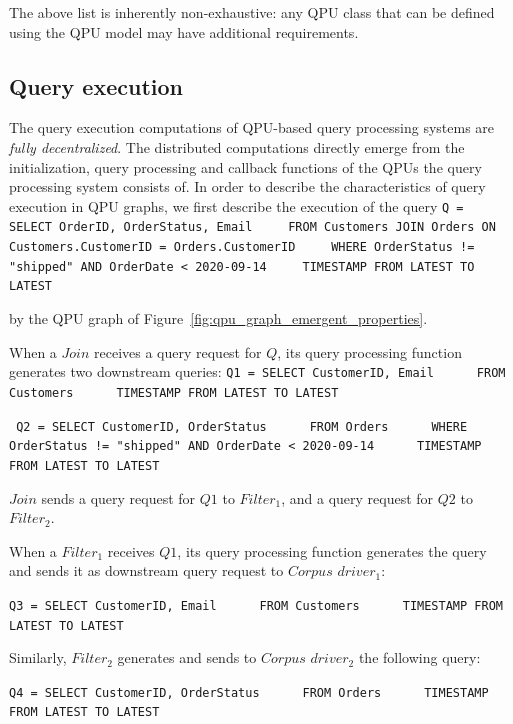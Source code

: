 The above list is inherently non-exhaustive:
any QPU class that can be defined using the QPU model may have additional requirements.

\subsection{Query execution}
\label{sec:computation_model}

The query execution computations of QPU-based query processing systems are \textit{fully decentralized}.
The distributed computations directly emerge from the initialization, query processing and callback functions of the QPUs
the query processing system consists of.
In order to describe the characteristics of query execution in QPU graphs, we first describe the execution of the query
{\obeylines\obeyspaces
\texttt{Q = SELECT OrderID, OrderStatus, Email
        ~~~~FROM Customers JOIN Orders ON Customers.CustomerID = Orders.CustomerID
        ~~~~WHERE OrderStatus != "shipped" AND OrderDate < 2020-09-14
        ~~~~TIMESTAMP FROM LATEST TO LATEST
        }}

by the QPU graph of Figure~\ref{fig:qpu_graph_emergent_properties}.

When a $Join$ receives a query request for $Q$, its query processing function generates two downstream queries:
{\obeylines\obeyspaces
\texttt{Q1 = SELECT CustomerID, Email
        ~~~~~FROM Customers
        ~~~~~TIMESTAMP FROM LATEST TO LATEST
        }}

{\obeylines\obeyspaces
\texttt{
        Q2 = SELECT CustomerID, OrderStatus
        ~~~~~FROM Orders
        ~~~~~WHERE OrderStatus != "shipped" AND OrderDate < 2020-09-14
        ~~~~~TIMESTAMP FROM LATEST TO LATEST
        }}

$Join$ sends a query request for $Q1$ to $Filter_1$, and a query request for $Q2$ to $Filter_2$.

When a $Filter_1$ receives $Q1$, its query processing function generates the query and sends it as downstream query request
to $Corpus$ $driver_1$:

{\obeylines\obeyspaces
\texttt{Q3 = SELECT CustomerID, Email
        ~~~~~FROM Customers
        ~~~~~TIMESTAMP FROM LATEST TO LATEST
        }}

Similarly, $Filter_2$ generates and sends to $Corpus$ $driver_2$ the following query:

{\obeylines\obeyspaces
\texttt{Q4 = SELECT CustomerID, OrderStatus
        ~~~~~FROM Orders
        ~~~~~TIMESTAMP FROM LATEST TO LATEST
        }}


